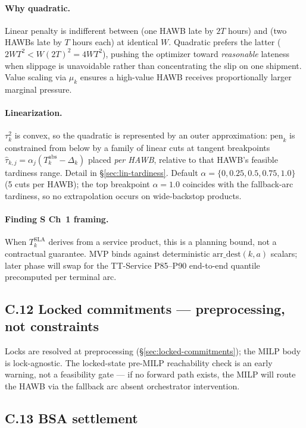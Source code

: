 \documentclass[11pt,a4paper]{article}
\theoremstyle{definition}
\begin{document}
\paragraph{Why quadratic.}
Linear penalty is indifferent between (one HAWB late by $2T$ hours) and (two
HAWBs late by $T$ hours each) at identical $W$. Quadratic prefers the latter
($2 W T^2 < W (2T)^2 = 4 W T^2$), pushing the optimizer toward
\emph{reasonable} lateness when slippage is unavoidable rather than
concentrating the slip on one shipment. Value scaling via $\mu_k$ ensures a
high-value HAWB receives proportionally larger marginal pressure.

\paragraph{Linearization.}
$\tau_k^2$ is convex, so the quadratic is represented by an outer
approximation: $\text{pen}_k$ is constrained from below by a family of
linear cuts at tangent breakpoints $\hat\tau_{k,j} = \alpha_j (T_k^{\text{abs}}
- \Delta_k)$ placed \emph{per HAWB}, relative to that HAWB's feasible
tardiness range. Detail in \S\ref{sec:lin-tardiness}. Default
$\alpha = \{0, 0.25, 0.5, 0.75, 1.0\}$ (5 cuts per HAWB); the top breakpoint
$\alpha = 1.0$ coincides with the fallback-arc tardiness, so no extrapolation
occurs on wide-backstop products.

\paragraph{Finding S Ch~1 framing.}
When $T_k^{\text{SLA}}$ derives from a service product, this is a planning
bound, not a contractual guarantee. MVP binds against deterministic
$\text{arr\_dest}(k, a)$ scalars; later phase will swap for the TT-Service
P85--P90 end-to-end quantile precomputed per terminal arc.

\subsection*{C.12 Locked commitments --- preprocessing, not constraints}

Locks are resolved at preprocessing (\S\ref{sec:locked-commitments}); the
MILP body is lock-agnostic. The locked-state pre-MILP reachability check is
an early warning, not a feasibility gate --- if no forward path exists, the
MILP will route the HAWB via the fallback arc absent orchestrator
intervention.

\subsection*{C.13 BSA settlement}
\end{document}
